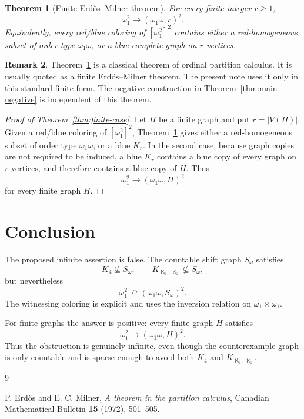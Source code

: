 \documentclass[11pt,a4paper]{amsart}
\newtheorem{theorem}{Theorem}[section]
\theoremstyle{definition}
\newtheorem{remark}[theorem]{Remark}
\begin{document}
\begin{theorem}[Finite Erd\H{o}s--Milner theorem]\label{thm:finite-erdos-milner}
For every finite integer $r\ge1$,
\[
        \omega_1^2\to(\omega_1\omega,r)^2.
\]
Equivalently, every red/blue coloring of $[\omega_1^2]^2$ contains either a red-homogeneous subset of order type $\omega_1\omega$, or a blue complete graph on $r$ vertices.
\end{theorem}

\begin{remark}
Theorem~\ref{thm:finite-erdos-milner} is a classical theorem of ordinal partition calculus.  It is usually quoted as a finite Erd\H{o}s--Milner theorem.  The present note uses it only in this standard finite form.  The negative construction in Theorem~\ref{thm:main-negative} is independent of this theorem.
\end{remark}

\begin{proof}[Proof of Theorem~\ref{thm:finite-case}]
Let $H$ be a finite graph and put $r=|V(H)|$.  Given a red/blue coloring of $[\omega_1^2]^2$, Theorem~\ref{thm:finite-erdos-milner} gives either a red-homogeneous subset of order type $\omega_1\omega$, or a blue $K_r$.  In the second case, because graph copies are not required to be induced, a blue $K_r$ contains a blue copy of every graph on $r$ vertices, and therefore contains a blue copy of $H$.  Thus
\[
        \omega_1^2\to(\omega_1\omega,H)^2
\]
for every finite graph $H$.
\end{proof}

\section{Conclusion}

The proposed infinite assertion is false.  The countable shift graph $S_\omega$ satisfies
\[
        K_4\nsubseteq S_\omega,
        \qquad
        K_{\aleph_0,\aleph_0}\nsubseteq S_\omega,
\]
but nevertheless
\[
        \omega_1^2\nrightarrow(\omega_1\omega,S_\omega)^2.
\]
The witnessing coloring is explicit and uses the inversion relation on $\omega_1\times\omega_1$.

For finite graphs the answer is positive: every finite graph $H$ satisfies
\[
        \omega_1^2\to(\omega_1\omega,H)^2.
\]
Thus the obstruction is genuinely infinite, even though the counterexample graph is only countable and is sparse enough to avoid both $K_4$ and $K_{\aleph_0,\aleph_0}$.

\begin{thebibliography}{9}

P. Erd\H{o}s and E. C. Milner,
\emph{A theorem in the partition calculus},
Canadian Mathematical Bulletin \textbf{15} (1972), 501--505.

\end{thebibliography}
\end{document}
